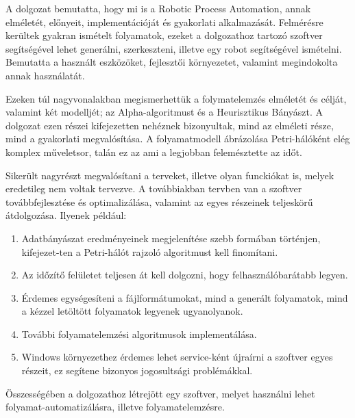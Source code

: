 
A dolgozat bemutatta, hogy mi is a Robotic Process Automation, annak elméletét, előnyeit, implementációját és gyakorlati alkalmazását. Felmérésre kerültek gyakran ismételt folyamatok, ezeket a dolgozathoz tartozó szoftver segítségével lehet generálni, szerkeszteni, illetve egy robot segítségével ismételni. Bemutatta a használt eszközöket, fejlesztői környezetet, valamint megindokolta annak használatát.

Ezeken túl nagyvonalakban megismerhettük a folymatelemzés elméletét és célját, valamint két modelljét; az Alpha-algoritmust és a Heurisztikus Bányászt. A dolgozat ezen részei kifejezetten nehéznek bizonyultak, mind az elméleti része, mind a gyakorlati megvalósítása. A folyamatmodell ábrázolása Petri-hálóként elég komplex műveletsor, talán ez az ami a legjobban felemésztette az időt.

Sikerült nagyrészt megvalósítani a terveket, illetve olyan funckiókat is, melyek eredetileg nem voltak tervezve. 
A továbbiakban tervben van a szoftver továbbfejlesztése és optimalizálása, valamint az egyes részeinek teljeskörű átdolgozása. Ilyenek például:
\begin{enumerate}
\item Adatbányászat eredményeinek megjelenítése szebb formában történjen, kifejezet\hyp{}ten a Petri-hálót rajzoló algoritmust kell finomítani.
\item Az időzítő felületet teljesen át kell dolgozni, hogy felhasználóbarátabb legyen.
\item Érdemes egységesíteni a fájlformátumokat, mind a generált folyamatok, mind a kézzel letöltött folyamatok legyenek ugyanolyanok.
\item További folyamatelemzési algoritmusok implementálása.
\item Windows környezethez érdemes lehet service-ként újraírni a szoftver egyes részeit, ez segítene bizonyos jogosultsági problémákkal.
\end{enumerate}

Összességében a dolgozathoz létrejött egy szoftver, melyet használni lehet folyamat\hyp{}automatizálásra, illetve folyamatelemzésre.